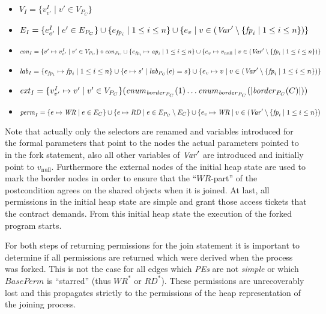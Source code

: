 	\begin{itemize}
		\item $V_I = \{v^{I}_{v'} \mid v'\in V_{P_{C}}\}$
		\item $E_I = \{e^{I}_{e'} \mid e'\in E_{P_{C}}\} \cup
			\{e_{\mathit{fp}_i}\mid 1\leq i\leq n\}\cup\{e_{v}\mid v\in(\mathit{Var}'\setminus
			\{\mathit{fp}_{i}\mid 1\leq i\leq n\})\}$
		\item $\mathit{con}_{I} = \{v'\mapsto v^{I}_{v'}\mid v'\in V_{P_{C}}\}
			\circ\mathit{con}_{P_{C}}\cup \{e_{\mathit{fp}_i}\mapsto\mathit{ap}_i\mid 1\leq i\leq n\}
			\cup\{e_{v}\mapsto v_{\text{null}}\mid v\in(\mathit{Var}'\setminus
			\{\mathit{fp}_{i}\mid 1\leq i\leq n\})\}$
		\item $\mathit{lab}_{I} = \{e_{\mathit{fp}_{i}}\mapsto\mathit{fp}_{i}\mid 1\leq i\leq n\}
			\cup\{e\mapsto s'\mid\mathit{lab}_{P_{C}}(e) = s\}\cup\{e_{v}\mapsto v\mid
			v\in(\mathit{Var}'\setminus \{\mathit{fp}_{i}\mid 1\leq i\leq n\})\}$
		\item $\mathit{ext}_I = \{v^{I}_{v'}\mapsto v'\mid v'\in V_{P_{C}}\}
			(\mathit{enum}_{\mathit{border}_{P_C}}(1)\dots\mathit{enum}_{\mathit{border}_{P_C}}(|\mathit{border}_{P_{C}}
			(C)|))$
		\item $\mathit{perm}_{I} = \{e\mapsto\mathit{WR}\mid e\in E_{C}\}\cup
			\{e\mapsto\mathit{RD}\mid e\in E_{P_{C}}\setminus E_{C}\}\cup
			\{e_{v}\mapsto\mathit{WR}\mid v\in(\mathit{Var}'\setminus \{\mathit{fp}_{i}\mid 1\leq
				i\leq n\})$
	\end{itemize}
	Note that actually only the selectors are renamed and variables introduced
	for the formal parameters that point to the nodes the actual parameters
	pointed to in the fork statement, also all other variables of $\mathit{Var}'$ are
	introduced and initially point to $v_{\text{null}}$. Furthermore the
	external nodes of the
	initial heap state are used to mark the border nodes in order to ensure that
	the \enquote{$\mathit{WR}$-part} of the postcondition agrees on the shared
	objects when it is joined. At last, all permissions in the initial heap
	state are simple and grant those access tickets that the contract demands.
	From this initial heap state the execution of the forked program starts.

	For both steps of returning permissions for the join statement it is
	important to determine if all
	permissions are returned which were derived when the process was forked.
	This is not the case for all edges which \emph{\acp{PE}} are not
	\emph{simple} or which $\mathit{BasePerm}$ is \enquote{starred} (thus
	$\mathit{WR^\ast}$ or $\mathit{RD^\ast}$). These permissions are
	unrecoverably lost and this propagates strictly to the permissions of the
	heap representation of the joining process.
	
